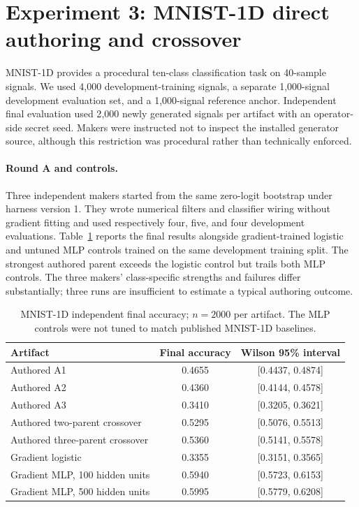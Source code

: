 \documentclass[11pt]{article}
\begin{document}
\section{Experiment 3: MNIST-1D direct authoring and crossover}\label{sec:mnist1d}
MNIST-1D provides a procedural ten-class classification task on 40-sample signals.
We used 4{,}000 development-training signals, a separate 1{,}000-signal development
evaluation set, and a 1{,}000-signal reference anchor. Independent final evaluation
used 2{,}000 newly generated signals per artifact with an operator-side secret seed.
Makers were instructed not to inspect the installed generator source, although this
restriction was procedural rather than technically enforced.

\paragraph{Round A and controls.} Three independent makers started from the same
zero-logit bootstrap under harness version 1. They wrote numerical filters and
classifier wiring without gradient fitting and used respectively four, five, and
four development evaluations. Table~\ref{tab:m1d} reports the final results alongside
gradient-trained logistic and untuned MLP controls trained on the same development
training split. The strongest authored parent exceeds the logistic control but trails
both MLP controls. The three makers' class-specific strengths and failures differ
substantially; three runs are insufficient to estimate a typical authoring outcome.

\begin{table}[t]
\centering\small
\begin{tabular}{lcc}
\toprule
Artifact & Final accuracy & Wilson 95\% interval\\
\midrule
Authored A1 & 0.4655 & [0.4437, 0.4874]\\
Authored A2 & 0.4360 & [0.4144, 0.4578]\\
Authored A3 & 0.3410 & [0.3205, 0.3621]\\
Authored two-parent crossover & 0.5295 & [0.5076, 0.5513]\\
Authored three-parent crossover & 0.5360 & [0.5141, 0.5578]\\
\midrule
Gradient logistic & 0.3355 & [0.3151, 0.3565]\\
Gradient MLP, 100 hidden units & 0.5940 & [0.5723, 0.6153]\\
Gradient MLP, 500 hidden units & 0.5995 & [0.5779, 0.6208]\\
\bottomrule
\end{tabular}
\caption{MNIST-1D independent final accuracy; $n=2000$ per artifact. The MLP
controls were not tuned to match published MNIST-1D baselines.}
\label{tab:m1d}
\end{table}
\end{document}
